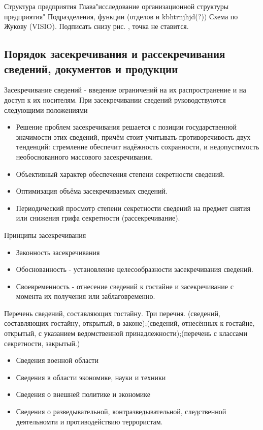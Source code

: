 \documentclass[a4paper,12pt]{report}
\begin{document}
	Структура предприятия
	Глава"исследование организационной структуры предприятия"
	Подразделения, функции (отделов и kbhtrnjhjd(?))
	Схема по Жукову (VISIO). Подписать снизу рис. , точка не ставится.



	\subsection{Порядок засекречивания и рассекречивания сведений, документов и продукции}

	Засекречивание сведений - введение ограничений на их распространение и на доступ к их носителям.
	При засекречивании сведений руководствуются следующими положениями
	\begin{itemize}
	\item	Решение проблем засекречивания решается с позиции государственной значимости этих сведений, причём стоит учитывать противоречивость двух тенденций: стремление обеспечит надёжность сохранности, и недопустимость необоснованного массового засекречивания.
	\item	Объективный характер обеспечения степени секретности сведений.
	\item	Оптимизация объёма засекречиваемых сведений.
	\item	Периодический просмотр степени секретности сведений на предмет снятия или снижения грифа секретности (рассекречивание).
	\end{itemize}

	Принципы засекречивания
	\begin{itemize}
	\item	Законность засекречивания
	\item	Обоснованность - установление целесообразности засекречивания сведений.
	\item	Своевременность - отнесение сведений к гостайне и засекречивание с момента их получения или заблаговременно.
	\end{itemize}

	Перечень сведений, составляющих гостайну. Три перечня. (сведений, составляющих гостайну, открытый, в законе);(сведений, отнесённых к гостайне, открытый, с указанием ведомственной принадлежности);(перечень с классами секретности, закрытый.)
	\begin{itemize}
	\item	Сведения военной области
	\item	Сведения в области экономике, науки и техники
	\item	Сведения о внешней политике и экономике
	\item 	Сведения о разведывательной, контразведывательной, следственной деятельномти и противодействию террористам.
	\end{itemize}
\end{document}

